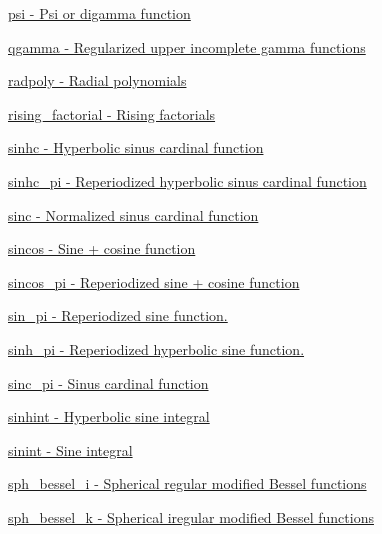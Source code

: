 \begin{DoxyItemize}
\item \hyperlink{group__gnu__math__spec__func_gaae7574990cdbb6a637d39c2c036928c0}{psi -\/ Psi or digamma function}
\item \hyperlink{group__gnu__math__spec__func_ga3ef7aeaa55f9e7b02f02d1d605a716a6}{qgamma -\/ Regularized upper incomplete gamma functions}
\item \hyperlink{group__gnu__math__spec__func_gac44ad9bda660a21a6b297d313f0ecf48}{radpoly -\/ Radial polynomials}
\item \hyperlink{group__gnu__math__spec__func_gad9410c6f678c673542d1b6243759ae05}{rising\+\_\+factorial -\/ Rising factorials}
\item \hyperlink{group__gnu__math__spec__func_gabafa26d8a2e592a0e080beae71ccbb7e}{sinhc -\/ Hyperbolic sinus cardinal function}
\item \hyperlink{group__gnu__math__spec__func_ga56bea42a4701761e82567f7100d9ca5e}{sinhc\+\_\+pi -\/ Reperiodized hyperbolic sinus cardinal function}
\item \hyperlink{group__gnu__math__spec__func_ga6a11b9d949ab86f9fd170dcf0d3b1251}{sinc -\/ Normalized sinus cardinal function}
\item \hyperlink{group__gnu__math__spec__func_ga8041c24b528475bcf8a4178e484652a3}{sincos -\/ Sine + cosine function}
\item \hyperlink{group__gnu__math__spec__func_ga011b1b2431b5f0467f7e3688b14628c6}{sincos\+\_\+pi -\/ Reperiodized sine + cosine function}
\item \hyperlink{group__gnu__math__spec__func_ga8fcd01a56e0c16d7568026c0bb4312eb}{sin\+\_\+pi -\/ Reperiodized sine function.}
\item \hyperlink{group__gnu__math__spec__func_gab004f7356231c96ae819d72e5d75b8dd}{sinh\+\_\+pi -\/ Reperiodized hyperbolic sine function.}
\item \hyperlink{group__gnu__math__spec__func_ga3dbc3831c1bd9f2a8be05496db9375a0}{sinc\+\_\+pi -\/ Sinus cardinal function}
\item \hyperlink{group__gnu__math__spec__func_ga203079a2b70127f16a8c434ea55d4e06}{sinhint -\/ Hyperbolic sine integral}
\item \hyperlink{group__gnu__math__spec__func_gaa588265d28710d36c7c4efa7d4f44ca4}{sinint -\/ Sine integral}
\item \hyperlink{group__gnu__math__spec__func_gad168511a86d4d25db99e2b08d5da038b}{sph\+\_\+bessel\+\_\+i -\/ Spherical regular modified Bessel functions}
\item \hyperlink{group__gnu__math__spec__func_ga9ad96c43b15e2c53d2f1b743e2eaa90f}{sph\+\_\+bessel\+\_\+k -\/ Spherical iregular modified Bessel functions}

\end{DoxyItemize}
